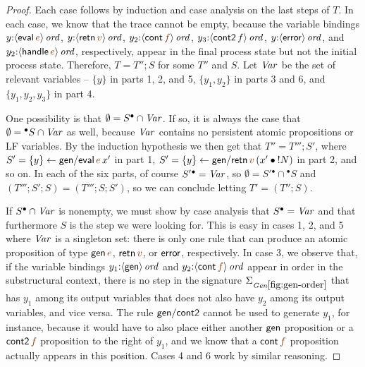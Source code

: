 \begin{proof}
  Each case follows by induction and case analysis on the last steps
  of $T$.  In each case, we know that the trace cannot be empty,
  because the variable bindings $y{:}\istrue{\susp{{\sf
        eval}\,\lf{e}}}$, $y{:}\istrue{\susp{{\sf retn}\,\lf{v}}}$,
  $y_2{:}\istrue{\susp{{\sf cont}\,\lf{f}}}$,
  $y_3{:}{\langle {{\sf cont2}\,f} \rangle}\,{{\it ord}}$, $y{:}{\langle {{\sf
        error}} \rangle}\,{{\it ord}}$, and $y_2{:}\istrue{\susp{{\sf handle}\,\lf{e}}}$,
  respectively, appear in the final process state but not the initial
  process state. Therefore, $T =
  T''; S$ for some $T''$ and $S$.  Let ${\it Var}$ be the set of relevant
  variables -- $\{y\}$ in parts 1, 2, and 5, $\{y_1, y_2\}$ in parts 3
  and 6, and $\{y_1,y_2,y_3\}$ in part 4. 

  One possibility is that $\emptyset = S^{\bullet} \cap {\it Var}$. If so, it
  is always the case that $\emptyset = {^{\bullet}S} \cap {\it Var}$ as well,
  because ${\it Var}$ contains no persistent atomic propositions or LF
  variables. By the induction hypothesis we then get that $T'' = T''';
  S'$, where $S' = \trstep{y}{{\sf gen/eval}\,\lf{e}\,x'}$ in part 1,
  $S' = \trstep{y}{{\sf gen/retn}\,\lf{v}\,(\tfuser{x'}{\tbangr{N}})}$
  in part 2, and so on.  In each of the six parts, of course
  $S'{^\bullet} = {\it Var}$, so $\emptyset = S'{^\bullet} \cap {^\bullet}S$
  and $\left(T'''; S'; S\right) = \left(T'''; S; S'\right)$, so we can
  conclude letting $T' = \left(T''; S\right)$.

  If $S^{\bullet} \cap {\it Var}$ is nonempty, we must show by case
  analysis that $S^{\bullet} = {\it Var}$ and that furthermore $S$ is
  the step we were looking for. This is easy in cases 1, 2, and 5
  where ${\it Var}$ is a singleton set: there is only one rule that
  can produce an atomic proposition of type ${\sf gen}\,\lf{e}$, ${\sf
    retn}\,\lf{v}$, or ${\sf error}$, respectively.  In case 3, we
  observe that, if the variable bindings $y_1{:}{\langle {{\sf
        gen}} \rangle}\,{{\it ord}}$ and $y_2{:}\istrue{\susp{{\sf cont}\,\lf{f}}}$ appear
  in order in the substructural context, there is no step in the
  signature $\siggenorder$ that has $y_1$ among its output variables
  that does not also have $y_2$ among its output variables, and vice
  versa. The rule ${\sf gen/cont2}$ cannot be used to generate $y_1$,
  for instance, because it would have to also place either another
  ${\sf gen}$ proposition or a ${\sf cont2}\,{\lf f}$ proposition to
  the right of $y_1$, and we know that a ${\sf cont}\,{\lf f}$
  proposition actually appears in this position. Cases 4 and 6 work
  by similar reasoning.
\end{proof}

